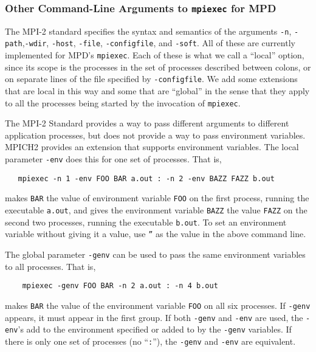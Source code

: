 \documentclass[dvipdfm,11pt]{article}
\begin{document}
\subsubsection{Other Command-Line Arguments to \texttt{mpiexec} for MPD}
\label{sec:environment}

The MPI-2 standard specifies the syntax and semantics of the arguments
\texttt{-n}, \texttt{-path},\texttt{-wdir}, \texttt{-host},
\texttt{-file}, \texttt{-configfile}, and \texttt{-soft}.  All of these
are currently implemented for MPD's \texttt{mpiexec}.
Each of these is what we call a ``local'' option, since
its scope is the processes in the set of processes described between
colons, or on separate lines of the file specified by
\texttt{-configfile}.  We add some extensions that are local in this way
and some that are ``global'' in the sense that they apply to all the
processes being started by the invocation of \texttt{mpiexec}.

The MPI-2 Standard provides a way to pass different arguments to different
application processes, but does not provide a way to pass environment
variables.  MPICH2 provides an extension that supports environment
variables.
The local parameter \texttt{-env} does this for one set of
processes.  That is,
\begin{verbatim}
   mpiexec -n 1 -env FOO BAR a.out : -n 2 -env BAZZ FAZZ b.out
\end{verbatim}
makes \texttt{BAR} the value of environment variable \texttt{FOO} on the
first process, running the executable \texttt{a.out}, and gives the
environment variable \texttt{BAZZ} the value \texttt{FAZZ} on the second
two processes, running the executable \texttt{b.out}.  To set an
environment variable without giving it a value, use \texttt{''} as the
value in the above command line.

The global parameter \texttt{-genv} can be used to pass the same
environment variables to all processes.  That is,
\begin{verbatim}
    mpiexec -genv FOO BAR -n 2 a.out : -n 4 b.out
\end{verbatim}
makes \texttt{BAR} the value of the environment variable \texttt{FOO} on
all six processes.  If \texttt{-genv} appears, it must appear in the
first group.  If both \texttt{-genv} and \texttt{-env} are used, the
\texttt{-env}'s add to the environment specified or added to by the
\texttt{-genv} variables.  If there is only one set of processes (no
``\texttt{:}''), the \texttt{-genv} and \texttt{-env} are equivalent.
\end{document}
